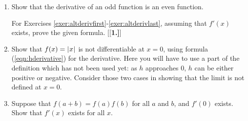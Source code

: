 {\begin{enumerate}[\bfseries 1.]
 interval $(a,b)$ and $f(x) < g(x)$ for all $x$ in $(a,b)$, then $f'(x) < g'(x)$
 for all $x$ in $(a,b)$. If true, prove it; if false, give a counterexample.
 Would your answer change if the restriction of $x$ to $(a,b)$ were removed and
 all real $x$ were used instead?
 \item Show that the derivative of an odd function is an even function.
\par\noindent For Exercises \ref{exer:altderivfirst}-\ref{exer:altderivlast},
assuming that $f'(x)$ exists, prove the given formula.
[{[\bfseries 1.]}]
 \vspace{2mm}
 \vspace{2mm}
 \item Show that $f(x) = \lvert\mspace{1mu}x\mspace{1mu}\rvert$ is not differentiable at $x=0$, using formula
 (\ref{eqn:hderivative}) for the derivative. Here you will have to use a part of
 the definition which has not been used yet: as $h$ approaches 0, $h$
 can be either positive or negative. Consider those two cases in showing that
 the limit is not defined at $x=0$.
 \item Suppose that $f(a+b) = f(a)f(b)$ for all $a$ and $b$, and
 $f'(0)$ exists. Show that $f'(x)$ exists for all $x$.
\end{enumerate}}
\newpage
